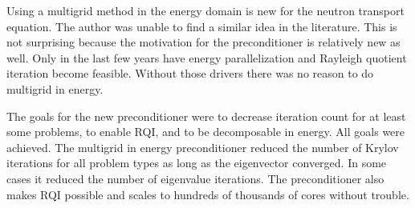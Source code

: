 Using a multigrid method in the energy domain is new for the neutron transport equation. The author was unable to find a similar idea in the literature. This is not surprising because the motivation for the preconditioner is relatively new as well. Only in the last few years have energy parallelization and Rayleigh quotient iteration become feasible. Without those drivers there was no reason to do multigrid in energy. 

The goals for the new preconditioner were to decrease iteration count for at least some problems, to enable RQI, and to be decomposable in energy. All goals were achieved. The multigrid in energy preconditioner reduced the number of Krylov iterations for all problem types as long as the eigenvector converged. In some cases it reduced the number of eigenvalue iterations. The preconditioner also makes RQI possible and scales to hundreds of thousands of cores without trouble. 











